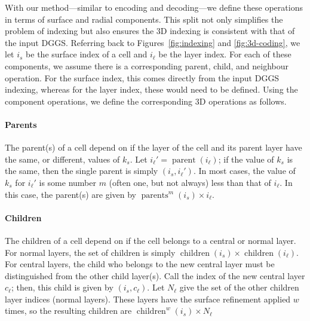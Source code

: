 With our method---similar to encoding and decoding---we define these operations in terms of surface and radial components.
This split not only simplifies the problem of indexing but also ensures the 3D indexing is consistent with that of the input DGGS.
Referring back to Figures~\ref{fig:indexing} and \ref{fig:3d-coding}, we let $i_s$ be the surface index of a cell and $i_\ell$ be the layer index.
For each of these components, we assume there is a corresponding parent, child, and neighbour operation.
For the surface index, this comes directly from the input DGGS indexing, whereas for the layer index, these would need to be defined.
Using the component operations, we define the corresponding 3D operations as follows.


\paragraph{Parents}
The parent(s) of a cell depend on if the layer of the cell and its parent layer have the same, or different, values of $k_s$.
Let $i_\ell' = \operatorname{parent}(i_\ell)$; if the value of $k_s$ is the same, then the single parent is simply $(i_s, i_\ell')$.
In most cases, the value of $k_s$ for $i_\ell'$ is some number $m$ (often one, but not always) less than that of $i_\ell$.
In this case, the parent(s) are given by $\operatorname{parents}^m(i_s) \times i_\ell$.


\paragraph{Children} The children of a cell depend on if the cell belongs to a central or normal layer.
For normal layers, the set of children is simply $\operatorname{children}(i_s) \times \operatorname{children}(i_\ell)$.
For central layers, the child who belongs to the new central layer must be distinguished from the other child layer(s).
Call the index of the new central layer $c_\ell$; then, this child is given by $(i_s, c_\ell)$.
Let $ N_\ell$ give the set of the other children layer indices (normal layers).
These layers have the surface refinement applied $w$ times, so the resulting children are $\operatorname{children}^w(i_s) \times N_\ell$


